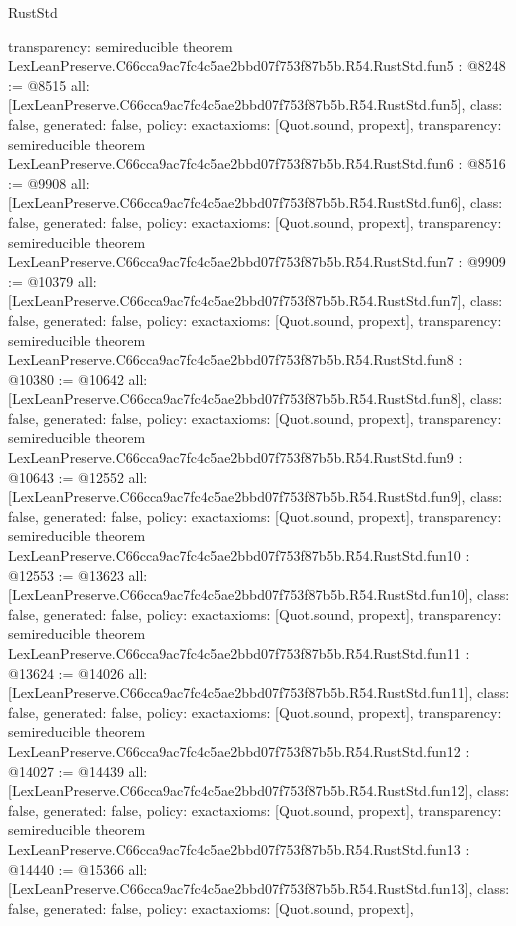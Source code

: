 \begin{lexlean}{RustStd}
\begin{coremodule}
{  transparency: semireducible
}
theorem LexLeanPreserve.C66cca9ac7fc4c5ae2bbd07f753f87b5b.R54.RustStd.fun5 : @8248 := @8515 {
  all: [LexLeanPreserve.C66cca9ac7fc4c5ae2bbd07f753f87b5b.R54.RustStd.fun5],
  class: false,
  generated: false,
  policy: exact{axioms: [Quot.sound, propext]},
  transparency: semireducible
}
theorem LexLeanPreserve.C66cca9ac7fc4c5ae2bbd07f753f87b5b.R54.RustStd.fun6 : @8516 := @9908 {
  all: [LexLeanPreserve.C66cca9ac7fc4c5ae2bbd07f753f87b5b.R54.RustStd.fun6],
  class: false,
  generated: false,
  policy: exact{axioms: [Quot.sound, propext]},
  transparency: semireducible
}
theorem LexLeanPreserve.C66cca9ac7fc4c5ae2bbd07f753f87b5b.R54.RustStd.fun7 : @9909 := @10379 {
  all: [LexLeanPreserve.C66cca9ac7fc4c5ae2bbd07f753f87b5b.R54.RustStd.fun7],
  class: false,
  generated: false,
  policy: exact{axioms: [Quot.sound, propext]},
  transparency: semireducible
}
theorem LexLeanPreserve.C66cca9ac7fc4c5ae2bbd07f753f87b5b.R54.RustStd.fun8 : @10380 := @10642 {
  all: [LexLeanPreserve.C66cca9ac7fc4c5ae2bbd07f753f87b5b.R54.RustStd.fun8],
  class: false,
  generated: false,
  policy: exact{axioms: [Quot.sound, propext]},
  transparency: semireducible
}
theorem LexLeanPreserve.C66cca9ac7fc4c5ae2bbd07f753f87b5b.R54.RustStd.fun9 : @10643 := @12552 {
  all: [LexLeanPreserve.C66cca9ac7fc4c5ae2bbd07f753f87b5b.R54.RustStd.fun9],
  class: false,
  generated: false,
  policy: exact{axioms: [Quot.sound, propext]},
  transparency: semireducible
}
theorem LexLeanPreserve.C66cca9ac7fc4c5ae2bbd07f753f87b5b.R54.RustStd.fun10 : @12553 := @13623 {
  all: [LexLeanPreserve.C66cca9ac7fc4c5ae2bbd07f753f87b5b.R54.RustStd.fun10],
  class: false,
  generated: false,
  policy: exact{axioms: [Quot.sound, propext]},
  transparency: semireducible
}
theorem LexLeanPreserve.C66cca9ac7fc4c5ae2bbd07f753f87b5b.R54.RustStd.fun11 : @13624 := @14026 {
  all: [LexLeanPreserve.C66cca9ac7fc4c5ae2bbd07f753f87b5b.R54.RustStd.fun11],
  class: false,
  generated: false,
  policy: exact{axioms: [Quot.sound, propext]},
  transparency: semireducible
}
theorem LexLeanPreserve.C66cca9ac7fc4c5ae2bbd07f753f87b5b.R54.RustStd.fun12 : @14027 := @14439 {
  all: [LexLeanPreserve.C66cca9ac7fc4c5ae2bbd07f753f87b5b.R54.RustStd.fun12],
  class: false,
  generated: false,
  policy: exact{axioms: [Quot.sound, propext]},
  transparency: semireducible
}
theorem LexLeanPreserve.C66cca9ac7fc4c5ae2bbd07f753f87b5b.R54.RustStd.fun13 : @14440 := @15366 {
  all: [LexLeanPreserve.C66cca9ac7fc4c5ae2bbd07f753f87b5b.R54.RustStd.fun13],
  class: false,
  generated: false,
  policy: exact{axioms: [Quot.sound, propext]},
}
\end{coremodule}
\end{lexlean}
